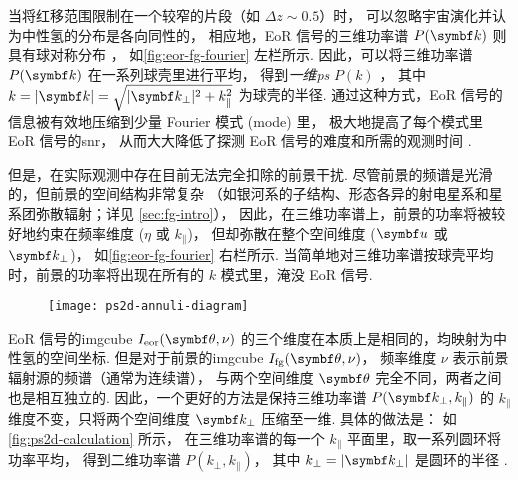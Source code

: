 当将红移范围限制在一个较窄的片段（如 $\Delta z \sim 0.5$）时，
可以忽略宇宙演化并认为中性氢的分布是各向同性的，
相应地，EoR 信号的三维功率谱 $P(\B{k})$ 则具有球对称分布
\cite{morales2004,mcQuinn2006}，
如\autoref{fig:eor-fg-fourier} 左栏所示.
因此，可以将三维功率谱 $P(\B{k})$ 在一系列球壳里进行平均，
得到\emph{一维\ac{ps}} $P(k)$ \cite{morales2004,datta2010}，
其中 $k = |\B{k}| = \sqrt{|\B{k}_{\bot}|^2 + k_{\parallel}^2}$ 为球壳的半径.
通过这种方式，EoR 信号的信息被有效地压缩到少量 Fourier 模式 (mode) 里，
极大地提高了每个模式里 EoR 信号的\ac{snr}，
从而大大降低了探测 EoR 信号的难度和所需的观测时间 \cite{datta2010}.

但是，在实际观测中存在目前无法完全扣除的前景干扰.
尽管前景的频谱是光滑的，但前景的空间结构非常复杂
（如银河系的子结构、形态各异的射电星系和星系团弥散辐射；详见 \autoref{sec:fg-intro}），
因此，在三维功率谱上，前景的功率将被较好地约束在频率维度 ($\eta$ 或 $k_{\parallel}$)，
但却弥散在整个空间维度 ($\B{u}$ 或 $\B{k}_{\bot}$)，
如\autoref{fig:eor-fg-fourier} 右栏所示.
当简单地对三维功率谱按球壳平均时，前景的功率将出现在所有的 $k$ 模式里，淹没 EoR 信号.

\begin{figure}[tbp]
  \centering
  \texttt{[image: ps2d-annuli-diagram]}
  \label{fig:ps2d-calculation}
\end{figure}

EoR 信号的\ac{imgcube} $I_{\R{eor}}(\B{\theta}, \nu)$
的三个维度在本质上是相同的，均映射为中性氢的空间坐标.
但是对于前景的\ac{imgcube} $I_{\R{fg}}(\B{\theta}, \nu)$，
频率维度 $\nu$ 表示前景辐射源的频谱（通常为连续谱），
与两个空间维度 $\B{\theta}$ 完全不同，两者之间也是相互独立的.
因此，一个更好的方法是保持三维功率谱 $P(\B{k}_{\bot}, k_{\parallel})$
的 $k_{\parallel}$ 维度不变，只将两个空间维度 $\B{k}_{\bot}$ 压缩至一维.
具体的做法是：
如\autoref{fig:ps2d-calculation} 所示，
在三维功率谱的每一个 $k_{\parallel}$ 平面里，取一系列圆环将功率平均，
得到二维功率谱 $P(k_{\bot}, k_{\parallel})$，
其中 $k_{\bot} = |\B{k}_{\bot}|$ 是圆环的半径 \cite{datta2010,thyagarajan2013}.

